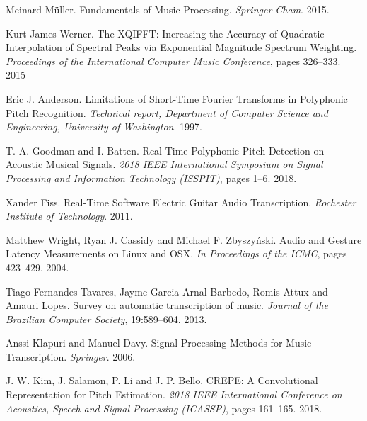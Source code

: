 \documentclass[a4paper,10pt,twocolumn]{article}
\begin{document}
\begin{thebibliography}{XX}
Meinard Müller. Fundamentals of Music Processing. \textit{Springer Cham}. 2015.


Kurt James Werner. The XQIFFT: Increasing the Accuracy of Quadratic Interpolation of Spectral Peaks via Exponential Magnitude Spectrum Weighting. \textit{Proceedings of the International Computer Music Conference}, pages 326--333. 2015

Eric J. Anderson. Limitations of Short-Time Fourier Transforms in Polyphonic Pitch Recognition. \textit{Technical report, Department of Computer Science and Engineering, University of Washington}. 1997.

T. A. Goodman and I. Batten. Real-Time Polyphonic Pitch Detection on Acoustic Musical Signals. \textit{2018 IEEE International Symposium on Signal Processing and Information Technology (ISSPIT)}, pages 1--6. 2018.

Xander Fiss. Real-Time Software Electric Guitar Audio Transcription. \textit{Rochester Institute of Technology}. 2011.

Matthew Wright, Ryan J. Cassidy and Michael F. Zbyszyński. Audio and Gesture Latency Measurements on Linux and OSX. \textit{In Proceedings of the ICMC}, pages 423--429. 2004.

Tiago Fernandes Tavares, Jayme Garcia Arnal Barbedo, Romis Attux and Amauri Lopes. Survey on automatic transcription of music. \textit{Journal of the Brazilian Computer Society}, 19:589--604. 2013.

Anssi Klapuri and Manuel Davy. Signal Processing Methods for Music Transcription. \textit{Springer}. 2006.

J. W. Kim, J. Salamon, P. Li and J. P. Bello. CREPE: A Convolutional Representation for Pitch Estimation. \textit{2018 IEEE International Conference on Acoustics, Speech and Signal Processing (ICASSP)}, pages 161--165. 2018.


\end{thebibliography}
\end{document}
